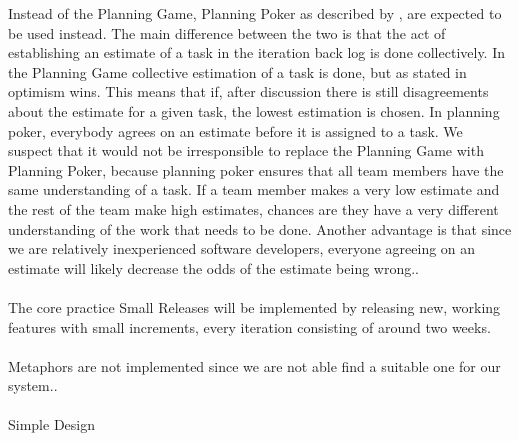 Instead of the Planning Game, Planning Poker as described by \citep{xp:planningPoker} , are expected to be used instead. The main difference between the two is that the act of establishing an estimate of a task in the iteration back log is done collectively. In the Planning Game collective estimation of a task is done, but as stated in \citep[p. 58]{xp:planning} optimism wins. This means that if, after discussion there is still disagreements about the estimate for a given task, the lowest estimation is chosen. In planning poker, everybody agrees on an estimate before it is assigned to a task. We suspect that it would not be irresponsible to replace the Planning Game with Planning Poker, because planning poker ensures that all team members have the same understanding of a task. If a team member makes a very low estimate and the rest of the team make high estimates, chances are they have a very different understanding of the work that needs to be done. Another advantage is that since we are relatively inexperienced software developers, everyone agreeing on an estimate will likely decrease the odds of the estimate being wrong..\\\\

The core practice Small Releases will be implemented by releasing new, working features with small increments, every iteration consisting of around two weeks.\\\\

Metaphors are not implemented since we are not able find a suitable one for our system..\\\\

Simple Design 
